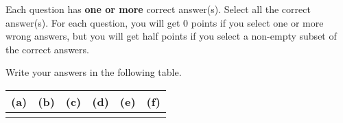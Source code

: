 
Each question has \textbf{one or more} correct answer(s). Select all the correct answer(s). For each question, you will get 0 points if you select one or more wrong answers, but you will get half points if you select a non-empty subset of the correct answers.

Write your answers in the following table.


\begin{table}[h]
    \centering
    \renewcommand{\arraystretch}{1.25}
    \begin{tabular}{|p{2cm}|p{2cm}|p{2cm}|p{2cm}|p{2cm}|p{2cm}|}
        \hline 
        (a) & (b) & (c) & (d) & (e) & (f) \\
        \hline
        &  &  &  &  &  \\

        \hline
    \end{tabular} 
\end{table}


